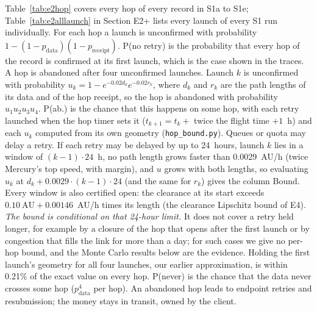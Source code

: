 \documentclass[10pt,letterpaper]{article}
\makeatletter
\renewcommand\paragraph{\@startsection{paragraph}{4}{\z@}{4pt plus 1pt}{-0.6em}{\normalfont\normalsize\bfseries}}
\makeatother
\begin{document}
\paragraph{Backbone.} Table~\ref{tab:e2hop} covers every hop of every record in S1a to S1e;
Table~\ref{tab:e2alllaunch} in Section E2+ lists every launch of every S1 run individually. For each hop
a launch is unconfirmed with probability $1 - (1 - p_\text{data})(1 - p_\text{receipt})$. P(no retry) is the
probability that every hop of the record is confirmed at its first launch, which is the case shown in the traces. A hop
is abandoned after four unconfirmed launches. Launch $k$ is unconfirmed with probability
$u_k = 1 - e^{-0.02 d_k} e^{-0.02 r_k}$, where $d_k$ and $r_k$ are the path lengths of its data and of the hop receipt,
so the hop is abandoned with probability $u_1 u_2 u_3 u_4$. P(ab.) is the chance that this happens on some hop,
with each retry launched when the hop timer sets it ($t_{k+1} = t_k + $ twice the flight time $+ 1$~h) and each $u_k$
computed from its own geometry (\texttt{hop\_bound.py}). Queues or quota may delay a retry. If each retry may be
delayed by up to 24~hours, launch $k$ lies in a window of $(k-1) \cdot 24$~h, no path length grows faster than
0.0029~AU/h (twice Mercury's top speed, with margin), and $u$ grows with both lengths, so evaluating $u_k$ at
$d_k + 0.0029 \cdot (k-1) \cdot 24$ (and the same for $r_k$) gives the column Bound. Every window is also certified open:
the clearance at its start exceeds $0.10~\text{AU} + 0.00146$~AU/h times its length (the clearance Lipschitz bound
of E4). \emph{The bound is conditional on that 24-hour limit.} It does not cover a retry held longer, for example by a
closure of the hop that opens after the first launch or by congestion that fills the link for more than a day; for
such cases we give no per-hop bound, and the Monte Carlo results below are the evidence. Holding the first launch's geometry for all four launches, our earlier approximation, is within
0.21\% of the exact value on every hop. P(never) is the chance that the data never crosses some hop ($p_\text{data}^4$ per hop).
An abandoned hop leads to endpoint retries and resubmission; the money stays in transit, owned by the client.
\end{document}
